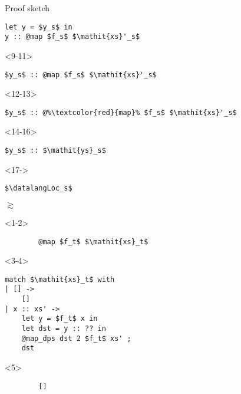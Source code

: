 \begin{frame}[fragile]{Proof sketch}
\begin{minipage}{.4\columnwidth}
\begin{onlyenv}
        \begin{lstlisting}
let y = $y_s$ in
y :: @map $f_s$ $\mathit{xs}'_s$
        \end{lstlisting}
    \end{onlyenv}
    \begin{onlyenv}<9-11>
        \begin{lstlisting}
$y_s$ :: @map $f_s$ $\mathit{xs}'_s$
        \end{lstlisting}
    \end{onlyenv}
    \begin{onlyenv}<12-13>
        \begin{lstlisting}
$y_s$ :: @%\textcolor{red}{map}% $f_s$ $\mathit{xs}'_s$
        \end{lstlisting}
    \end{onlyenv}
    \begin{onlyenv}<14-16>
        \begin{lstlisting}
$y_s$ :: $\mathit{ys}_s$
        \end{lstlisting}
    \end{onlyenv}
    \begin{onlyenv}<17->
        \begin{lstlisting}
$\datalangLoc_s$
        \end{lstlisting}
    \end{onlyenv}
\end{minipage}
\begin{minipage}{.05\columnwidth}
$\gtrsim$
\end{minipage}
\begin{minipage}{.4\columnwidth}
    \begin{onlyenv}<1-2>
        \begin{lstlisting}
        @map $f_t$ $\mathit{xs}_t$
        \end{lstlisting}
    \end{onlyenv}
    \begin{onlyenv}<3-4>
        \begin{lstlisting}
match $\mathit{xs}_t$ with
| [] ->
    []
| x :: xs' ->
    let y = $f_t$ x in
    let dst = y :: ?? in
    @map_dps dst 2 $f_t$ xs' ;
    dst
        \end{lstlisting}
    \end{onlyenv}
    \begin{onlyenv}<5>
        \begin{lstlisting}
        []
        \end{lstlisting}
    \end{onlyenv}

\end{minipage}
\end{frame}
